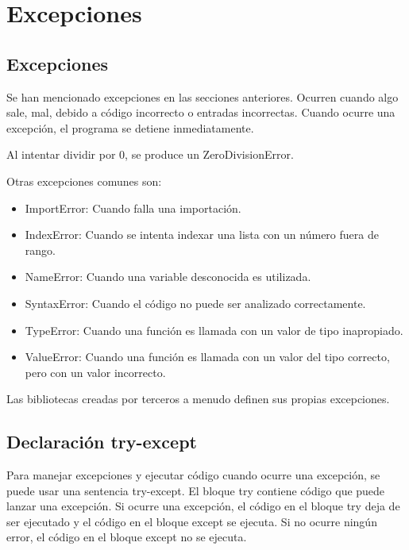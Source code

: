 \documentclass{report}
\begin{document}
\clearpage\chapter{Excepciones}

\section{Excepciones}

Se han mencionado excepciones en las secciones anteriores. Ocurren cuando algo sale, mal, debido a código incorrecto o entradas incorrectas. Cuando ocurre una excepción, el programa se detiene inmediatamente.\smallskip

Al intentar dividir por 0, se produce un ZeroDivisionError.


Otras excepciones comunes son:

\begin{itemize}
  \item ImportError: Cuando falla una importación.
  
  \item IndexError: Cuando se intenta indexar una lista con un número fuera de rango.
  
  \item NameError: Cuando una variable desconocida es utilizada.
  
  \item SyntaxError: Cuando el código no puede ser analizado correctamente.
  
  \item TypeError: Cuando una función es llamada con un valor de tipo inapropiado.
  
  \item ValueError: Cuando una función es llamada con un valor del tipo correcto, pero con un valor incorrecto.
  
\end{itemize}

Las bibliotecas creadas por terceros a menudo definen sus propias excepciones.

\section{Declaración try-except}

Para manejar excepciones y ejecutar código cuando ocurre una excepción, se puede usar una sentencia try-except. El bloque try contiene código que puede lanzar una excepción. Si ocurre una excepción, el código en el bloque try deja de ser ejecutado y el código en el bloque except se ejecuta. Si no ocurre ningún error, el código en el bloque except no se ejecuta.
\end{document}
